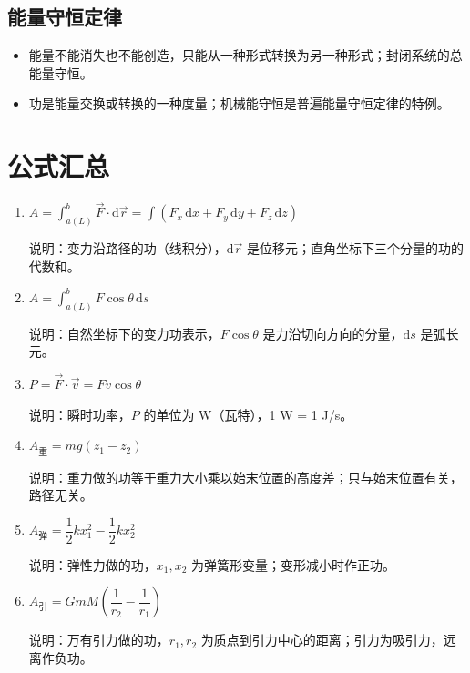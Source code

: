 \documentclass[12pt,a4paper]{ctexart}
\begin{document}
\subsection{能量守恒定律}

\begin{itemize}
    \item 能量不能消失也不能创造，只能从一种形式转换为另一种形式；封闭系统的总能量守恒。
    \item 功是能量交换或转换的一种度量；机械能守恒是普遍能量守恒定律的特例。
\end{itemize}

\section{公式汇总}

\begin{enumerate}[leftmargin=3em,label=\textbf{公式\arabic*}：,ref=公式\arabic*]

    \item $A = \displaystyle\int_{a(L)}^b \vec{F}\cdot\mathrm{d}\vec{r} = \int (F_x\,\mathrm{d}x + F_y\,\mathrm{d}y + F_z\,\mathrm{d}z)$

    说明：变力沿路径的功（线积分），$\mathrm{d}\vec{r}$ 是位移元；直角坐标下三个分量的功的代数和。

    \item $A = \displaystyle\int_{a(L)}^b F\cos\theta\,\mathrm{d}s$

    说明：自然坐标下的变力功表示，$F\cos\theta$ 是力沿切向方向的分量，$\mathrm{d}s$ 是弧长元。

    \item $P = \vec{F}\cdot\vec{v} = Fv\cos\theta$

    说明：瞬时功率，$P$ 的单位为 W（瓦特），1 W = 1 J/s。

    \item $A_{\text{重}} = mg(z_1 - z_2)$

    说明：重力做的功等于重力大小乘以始末位置的高度差；只与始末位置有关，路径无关。

    \item $A_{\text{弹}} = \dfrac{1}{2}kx_1^2 - \dfrac{1}{2}kx_2^2$

    说明：弹性力做的功，$x_1,x_2$ 为弹簧形变量；变形减小时作正功。

    \item $A_{\text{引}} = GmM\left(\dfrac{1}{r_2} - \dfrac{1}{r_1}\right)$

    说明：万有引力做的功，$r_1,r_2$ 为质点到引力中心的距离；引力为吸引力，远离作负功。


\end{enumerate}
\end{document}
